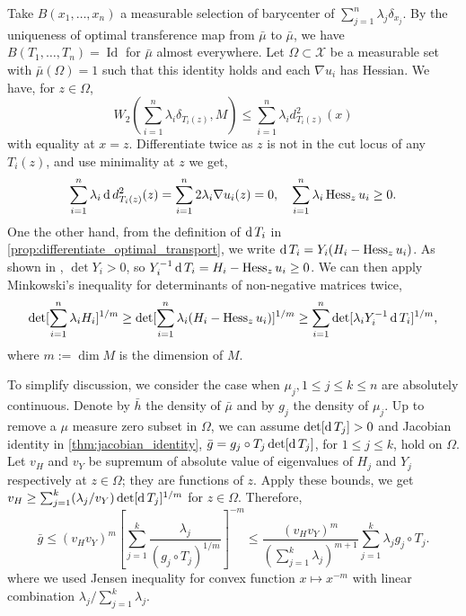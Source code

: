 Take $B(x_1,\ldots,x_n)$ a measurable selection of barycenter of $\sum_{j=1}^n \lambda_j \delta_{x_j}$.
By the uniqueness of optimal transference map from $\bar{\mu}$ to $\bar{\mu}$,
we have $B(T_1, \ldots, T_n) = \operatorname{Id}$ for $\bar{\mu}$ almost everywhere.
Let $\Omega \subset \mathcal{X} $ be a measurable set with $\bar{\mu}(\Omega) = 1 $ such that
this identity holds and each $\nabla u_i$ has Hessian.
We have, for $z \in \Omega$,
\[
	W_2(\sum_{i=1}^n \lambda_i \delta_{T_i(z)}, M) \leq \sum_{i=1}^n \lambda_i d_{T_i(z)}^2(x)
\] with equality at $x=z$.
Differentiate twice as $z$ is not in the cut locus of any $T_i(z)$,
and use minimality at $z$ we get,
\[
	\sum_{i=1}^n \lambda_i \operatorname{d} d^2_{T_i(z)} (z) =\sum_{i=1}^n 2 \lambda_i \nabla u_i (z) =0
	,\quad \sum_{i=1}^n \lambda_i \operatorname{Hess}_z u_i \geq 0.
\]
One the other hand, from the definition of $\operatorname{d} T_i$ in \cref{prop:differentiate_optimal_transport},
we write $\operatorname{d} T_i = Y_i ( H_i - \operatorname{Hess}_z u_i)$.
As shown in \cite[Lemma 2.1]{cordero2001riemannian}, $\det Y_i >0$,
so $Y_i^{-1} \operatorname{d} T_i = H_i - \operatorname{Hess}_z u_i \geq 0$.
We can then apply Minkowski's
inequality for determinants of non-negative matrices twice,
\[
	\det [\sum_{i=1}^n \lambda_i H_i]^{1/m} \geq \det [\sum_{i=1}^n \lambda_i(H_i - \operatorname{Hess}_z u_i)]^{1/m}
	\geq \sum_{i=1}^{n} \det[ \lambda_i Y_i^{-1} \operatorname{d} T_i]^{1/m},
\]
where $m := \dim M$ is the dimension of $M$.

To simplify discussion, we consider the case when $\mu_j, 1 \leq j \leq k \leq n$ are
absolutely continuous.
Denote by $\bar{h}$ the density of $\bar{\mu}$ and
by $g_j$ the density of $\mu_j$.
Up to remove a $\mu$ measure zero subset in $\Omega$,
we can assume $\det [\operatorname{d} T_j] >0$ and
Jacobian identity in \cref{thm:jacobian_identity},
$\bar{g} = g_j \circ T_j \det [\operatorname{d} T_j]$,
for $ 1\leq j \leq k$, hold on $\Omega$.
Let $v_H$ and $v_Y$ be supremum of absolute value
of eigenvalues of $H_j$ and $Y_j$ respectively at $z \in \Omega$;
they are functions of $z$.
Apply these bounds, we get
$v_H \geq \sum_{j=1}^k (\lambda_j / v_Y) \det [ \operatorname{d} T_j]^{1/m} $ for $z \in \Omega$.
Therefore,
\begin{equation}
	\label{equa:density_inequality}
	\bar{g} \leq (v_H v_Y)^m \left[  \sum_{j=1}^k \frac{ \lambda_j }
		{ (g_j \circ T_j)^{1/m}} \right]^{-m}
	\leq \frac{ (v_H v_Y)^m }{(\sum_{j=1}^k \lambda_j)^{m+1}}
	\sum_{j=1}^k \lambda_j g_j \circ T_j.
\end{equation}
where we used Jensen inequality for convex function $x \mapsto x^{-m}$
with linear combination $\lambda_j / \sum_{j=1}^k \lambda_j$.

